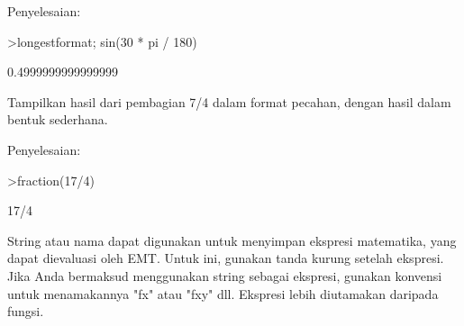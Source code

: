 \documentclass{article}
\begin{document}
\begin{eulernotebook}
\begin{eulercomment}
\begin{eulercomment}
\begin{eulercomment}
Penyelesaian:
\end{eulercomment}
\begin{eulerprompt}
>longestformat; sin(30 * pi / 180)
\end{eulerprompt}
\begin{euleroutput}
  0.4999999999999999
\end{euleroutput}
\begin{eulercomment}
Tampilkan hasil dari pembagian 7/4 dalam format pecahan, dengan hasil
dalam bentuk sederhana.

Penyelesaian:
\end{eulercomment}
\begin{eulerprompt}
>fraction(17/4)
\end{eulerprompt}
\begin{euleroutput}
  17/4
\end{euleroutput}
\begin{eulercomment}
\end{eulercomment}
\eulersubheading{}
\begin{eulercomment}
String atau nama dapat digunakan untuk menyimpan ekspresi matematika,
yang dapat dievaluasi oleh EMT. Untuk ini, gunakan tanda kurung
setelah ekspresi. Jika Anda bermaksud menggunakan string sebagai
ekspresi, gunakan konvensi untuk menamakannya "fx" atau "fxy" dll.
Ekspresi lebih diutamakan daripada fungsi.


\end{eulercomment}
\end{eulercomment}
\end{eulercomment}
\end{eulernotebook}
\end{document}
